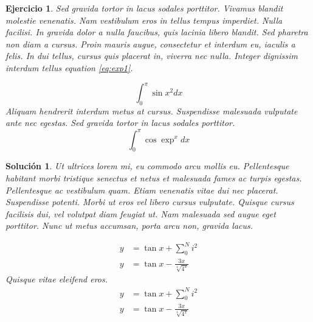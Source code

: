 \documentclass[12pt,tikz,border=5pt]{article}
\newtheorem{ejercicio}{Ejercicio}[section]
\newtheorem*{solucion}{Solución}
\begin{document}
\begin{ejercicio}
  Sed gravida tortor in lacus sodales porttitor. Vivamus blandit molestie venenatis. Nam vestibulum eros in tellus tempus imperdiet. Nulla facilisi. In gravida dolor a nulla faucibus, quis lacinia libero blandit. Sed pharetra non diam a cursus. Proin mauris augue, consectetur et interdum eu, iaculis a felis. In dui tellus, cursus quis placerat in, viverra nec nulla. Integer dignissim interdum tellus equation \ref{eq:exp1}.

  \begin{equation}
    \displaystyle\int_{0}^{\pi} \sin{x^2} dx
    \label{eq:exp1}
  \end{equation}
  Aliquam hendrerit interdum metus at cursus. Suspendisse malesuada vulputate ante nec egestas. Sed gravida tortor in lacus sodales porttitor. 
  \begin{equation*}
    \displaystyle\int_{0}^{\pi} \cos{\exp^{x}} dx
    \label{eq:exp2}
  \end{equation*}
\end{ejercicio}
\begin{solucion}
  Ut ultrices lorem mi, eu commodo arcu mollis eu. Pellentesque habitant morbi tristique senectus et netus et malesuada fames ac turpis egestas. Pellentesque ac vestibulum quam. Etiam venenatis vitae dui nec placerat. Suspendisse potenti. Morbi ut eros vel libero cursus vulputate. Quisque cursus facilisis dui, vel volutpat diam feugiat ut. Nam malesuada sed augue eget porttitor. Nunc ut metus accumsan, porta arcu non, gravida lacus. 
  
  \begin{align}
    y &= \tan{x} + \displaystyle\sum_{0}^{N} i^2 \\
    y &= \tan{x} - \displaystyle\frac{3x}{\sqrt[4]{4^{x}}}
  \end{align}
  Quisque vitae eleifend eros.
  \begin{align*}
    y &= \tan{x} + \displaystyle\sum_{0}^{N} i^2 \\
    y &= \tan{x} - \displaystyle\frac{3x}{\sqrt[4]{4^{x}}}
  \end{align*}
  
\end{solucion}



\end{document}
